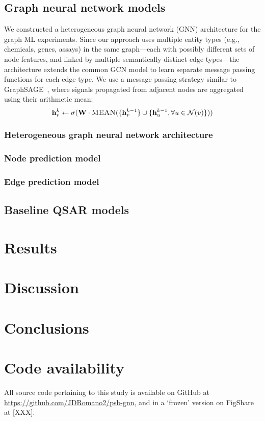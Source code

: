 \documentclass{ws-procs11x85}
\begin{document}
\subsection{Graph neural network models}
We constructed a heterogeneous graph neural network (GNN) architecture for the graph ML experiments.
Since our approach uses multiple entity types (e.g., chemicals, genes, assays) in the same graph---each with possibly different sets of node features, and linked by multiple semantically distinct edge types---the architecture extends the common GCN model to learn separate message passing functions for each edge type.
We use a message passing strategy similar to GraphSAGE~\cite{hamilton2017inductive}, where signals propagated from adjacent nodes are aggregated using their arithmetic mean:
\begin{equation}
\mathbf{h}_v^k \gets \sigma(\mathbf{W} \cdot \textsc{MEAN}(\{\mathbf{h}_v^{k-1}\}\cup \{ \mathbf{h}_u^{k-1},\forall u \in \mathcal{N}(v) \}))
\end{equation}

\subsubsection{Heterogeneous graph neural network architecture}

\subsubsection{Node prediction model}

\subsubsection{Edge prediction model}

\subsection{Baseline QSAR models}

\section{Results}

\section{Discussion}

\section{Conclusions}

\section{Code availability}
All source code pertaining to this study is available on GitHub at \url{https://github.com/JDRomano2/psb-gnn}, and in a `frozen' version on FigShare at [XXX].



\end{document}
